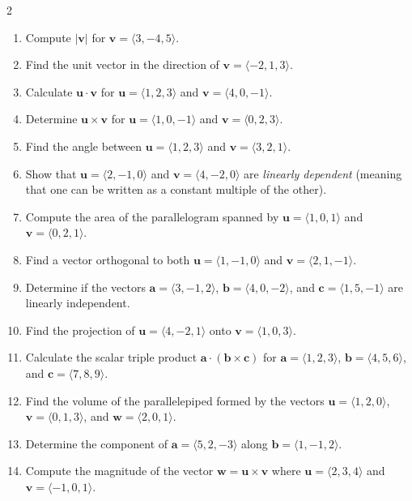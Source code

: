 \begin{multicols}{2}
\begin{enumerate}
    \item Compute \( |\mathbf{v}| \) for \( \mathbf{v} = \langle 3, -4, 5 \rangle \).
    \item Find the unit vector in the direction of \( \mathbf{v} = \langle -2, 1, 3 \rangle \).
    \item Calculate \( \mathbf{u} \cdot \mathbf{v} \) for \( \mathbf{u} = \langle 1, 2, 3 \rangle \) and \( \mathbf{v} = \langle 4, 0, -1 \rangle \).
    \item Determine \( \mathbf{u} \times \mathbf{v} \) for \( \mathbf{u} = \langle 1, 0, -1 \rangle \) and \( \mathbf{v} = \langle 0, 2, 3 \rangle \).
    \item Find the angle between \( \mathbf{u} = \langle 1, 2, 3 \rangle \) and \( \mathbf{v} = \langle 3, 2, 1 \rangle \).
    \item Show that \( \mathbf{u} = \langle 2, -1, 0 \rangle \) and \( \mathbf{v} = \langle 4, -2, 0 \rangle \) are \textit{linearly dependent} (meaning that one can be written as a constant multiple of the other).
    \item Compute the area of the parallelogram spanned by \( \mathbf{u} = \langle 1, 0, 1 \rangle \) and \( \mathbf{v} = \langle 0, 2, 1 \rangle \).
    \item Find a vector orthogonal to both \( \mathbf{u} = \langle 1, -1, 0 \rangle \) and \( \mathbf{v} = \langle 2, 1, -1 \rangle \).
    \item Determine if the vectors \( \mathbf{a} = \langle 3, -1, 2 \rangle \), \( \mathbf{b} = \langle 4, 0, -2 \rangle \), and \( \mathbf{c} = \langle 1, 5, -1 \rangle \) are linearly independent.
    \item Find the projection of \( \mathbf{u} = \langle 4, -2, 1 \rangle \) onto \( \mathbf{v} = \langle 1, 0, 3 \rangle \).
    \item Calculate the scalar triple product \( \mathbf{a} \cdot (\mathbf{b} \times \mathbf{c}) \) for \( \mathbf{a} = \langle 1, 2, 3 \rangle \), \( \mathbf{b} = \langle 4, 5, 6 \rangle \), and \( \mathbf{c} = \langle 7, 8, 9 \rangle \).
    \item Find the volume of the parallelepiped formed by the vectors \( \mathbf{u} = \langle 1, 2, 0 \rangle \), \( \mathbf{v} = \langle 0, 1, 3 \rangle \), and \( \mathbf{w} = \langle 2, 0, 1 \rangle \).
    \item Determine the component of \( \mathbf{a} = \langle 5, 2, -3 \rangle \) along \( \mathbf{b} = \langle 1, -1, 2 \rangle \).
    \item Compute the magnitude of the vector \( \mathbf{w} = \mathbf{u} \times \mathbf{v} \) where \( \mathbf{u} = \langle 2, 3, 4 \rangle \) and \( \mathbf{v} = \langle -1, 0, 1 \rangle \).

\end{enumerate}
\end{multicols}
